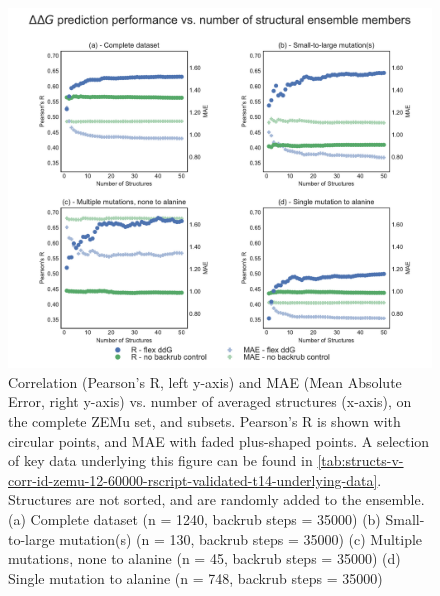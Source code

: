 \begin{figure}
  \includegraphics[width=\textwidth,keepaspectratio]{structs-v-corr-id-zemu-12-60000-rscript-validated-t14.pdf}
  \caption[]{ %
    Correlation (Pearson's R, left y-axis) and MAE (Mean Absolute Error, right y-axis) vs. number of averaged structures (x-axis), on the complete ZEMu set, and subsets.
    Pearson's R is shown with circular points, and MAE with faded plus-shaped points.
    A selection of key data underlying this figure can be found in \cref{tab:structs-v-corr-id-zemu-12-60000-rscript-validated-t14-underlying-data}.
    Structures are not sorted, and are randomly added to the ensemble. 
    (a) Complete dataset (n = 1240, backrub steps = 35000)
    (b) Small-to-large mutation(s) (n = 130, backrub steps = 35000)
    (c) Multiple mutations, none to alanine (n = 45, backrub steps = 35000)
    (d) Single mutation to alanine (n = 748, backrub steps = 35000)
  } \label{fig:structs-v-corr-id-zemu-12-60000-rscript-validated-t14}
\end{figure}
